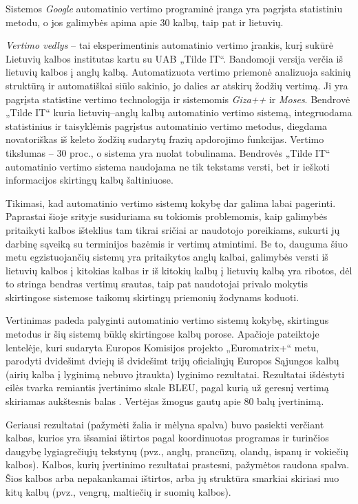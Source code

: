 \documentclass[]{../metanetpaper}
\begin{document}
\begin{multicols}{2}
    Sistemos \textit{Google} automatinio vertimo programinė įranga yra pagrįsta statistiniu metodu, o jos galimybės apima apie 30 kalbų, taip pat ir lietuvių.   

   \textit{Vertimo vedlys}  – tai eksperimentinis automatinio vertimo įrankis, kurį sukūrė Lietuvių kalbos institutas kartu su UAB „Tilde IT“. Bandomoji versija verčia iš lietuvių kalbos į anglų kalbą. Automatizuota vertimo priemonė analizuoja sakinių struktūrą ir automatiškai siūlo sakinio, jo dalies ar atskirų žodžių vertimą. Ji yra pagrįsta statistine vertimo technologija ir sistemomis \textit{Giza++}  ir \textit{Moses}. Bendrovė „Tilde IT“ kuria lietuvių–anglų kalbų automatinio vertimo sistemą, integruodama statistinius ir taisyklėmis pagrįstus automatinio vertimo metodus, diegdama novatoriškas iš keleto žodžių sudarytų frazių apdorojimo funkcijas. Vertimo tikslumas – 30 proc., o sistema yra nuolat tobulinama. Bendrovės „Tilde IT“ automatinio vertimo sistema naudojama ne tik tekstams versti, bet ir ieškoti informacijos skirtingų kalbų šaltiniuose.   

    Tikimasi, kad automatinio vertimo sistemų kokybę dar galima labai pagerinti. Paprastai šioje srityje susiduriama su tokiomis problemomis, kaip galimybės pritaikyti kalbos išteklius tam tikrai sričiai ar naudotojo poreikiams, sukurti jų darbinę sąveiką su terminijos bazėmis ir vertimų atmintimi. Be to, dauguma šiuo metu egzistuojančių sistemų yra pritaikytos anglų kalbai, galimybės versti iš lietuvių kalbos į kitokias kalbas ir iš kitokių kalbų į lietuvių kalbą yra ribotos, dėl to stringa bendras vertimų srautas, taip pat naudotojai privalo mokytis skirtingose sistemose taikomų skirtingų priemonių žodynams koduoti.   

    Vertinimas padeda palyginti automatinio vertimo sistemų kokybę, skirtingus metodus ir šių sistemų būklę skirtingose kalbų porose. Apačioje pateiktoje lentelėje, kuri sudaryta Europos Komisijos projekto „Euromatrix+“ metu, parodyti dvidešimt dviejų iš dvidešimt trijų oficialiųjų Europos Sąjungos kalbų (airių kalba į lyginimą nebuvo įtraukta) lyginimo rezultatai. Rezultatai išdėstyti eilės tvarka remiantis įvertinimo skale BLEU, pagal kurią už geresnį vertimą skiriamas aukštesnis balas \cite{bleu1}.  Vertėjas žmogus gautų apie 80 balų įvertinimą.   

    Geriausi rezultatai (pažymėti žalia ir mėlyna spalva) buvo pasiekti verčiant kalbas, kurios yra išsamiai ištirtos pagal koordinuotas programas ir turinčios daugybę lygiagrečiųjų tekstynų (pvz., anglų, prancūzų, olandų, ispanų ir vokiečių kalbos). Kalbos, kurių įvertinimo rezultatai prastesni, pažymėtos raudona spalva. Šios kalbos arba nepakankamai ištirtos, arba jų struktūra smarkiai skiriasi nuo kitų kalbų (pvz., vengrų, maltiečių ir suomių kalbos).


\end{multicols}
\end{document}
